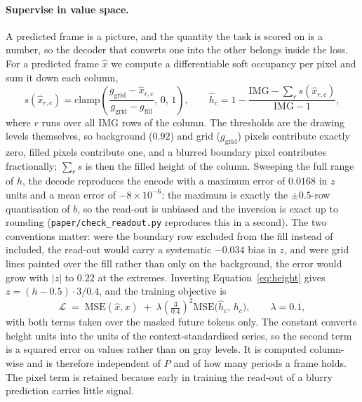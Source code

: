 \paragraph{Supervise in value space.} A predicted frame is a picture, and the quantity the task is
scored on is a number, so the decoder that converts one into the other belongs inside the loss. For
a predicted frame $\hat{x}$ we compute a differentiable soft occupancy per pixel and sum it down
each column,
\begin{equation}
s(\hat{x}_{r,c}) = \mathrm{clamp}\!\left(\frac{g_{\mathrm{grid}} - \hat{x}_{r,c}}
{g_{\mathrm{grid}}-g_{\mathrm{fill}}},\,0,\,1\right),
\qquad
\hat{h}_c = 1 - \frac{\mathrm{IMG} - \sum_{r} s(\hat{x}_{r,c})}{\mathrm{IMG}-1},
\label{eq:readout}
\end{equation}
where $r$ runs over all $\mathrm{IMG}$ rows of the column. The thresholds are the drawing levels
themselves, so background ($0.92$) and grid ($g_{\mathrm{grid}}$) pixels contribute exactly zero,
filled pixels contribute one, and a blurred boundary pixel contributes fractionally; $\sum_r s$ is
then the filled height of the column. Sweeping the full range of $h$, the decode reproduces
the encode with a maximum error of $0.0168$ in $z$ units and a mean error of $-8\times10^{-6}$; the
maximum is exactly the $\pm0.5$-row quantisation of $b$, so the read-out is unbiased and the
inversion is exact up to rounding (\texttt{paper/check\_readout.py} reproduces this in a second).
The two conventions matter: were the boundary row excluded from the fill instead of included, the
read-out would carry a systematic $-0.034$ bias in $z$, and were grid lines painted over the fill
rather than only on the background, the error would grow with $|z|$ to $0.22$ at the extremes. Inverting Equation~\ref{eq:height} gives
$z=(h-0.5)\cdot 3/0.4$, and the training objective is
\begin{equation}
\mathcal{L} \;=\; \mathrm{MSE}(\hat{x}, x)\;+\;\lambda\left(\tfrac{3}{0.4}\right)^{2}
\mathrm{MSE}\big(\hat{h}_c,\,h_c\big),\qquad \lambda=0.1 ,
\label{eq:loss}
\end{equation}
with both terms taken over the masked future tokens only. The constant converts height units into
the units of the context-standardised series, so the second term is a squared error on values rather
than on gray levels. It is computed column-wise and is
therefore independent of $P$ and of how many periods a frame holds. The pixel term is retained
because early in training the read-out of a blurry prediction carries little signal.

